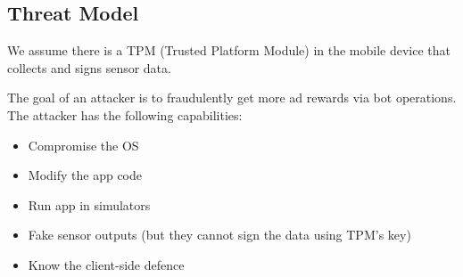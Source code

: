 \subsection{Threat Model}
We assume there is a TPM (Trusted Platform Module) in the mobile device that collects and signs sensor data.

The goal of an attacker is to fraudulently get more ad rewards via bot operations. The attacker has the following capabilities:

\begin{itemize}
    \item Compromise the OS
    \item Modify the app code
    \item Run app in simulators
    \item Fake sensor outputs (but they cannot sign the data using TPM's key) 
    \item Know the client-side defence
\end{itemize}